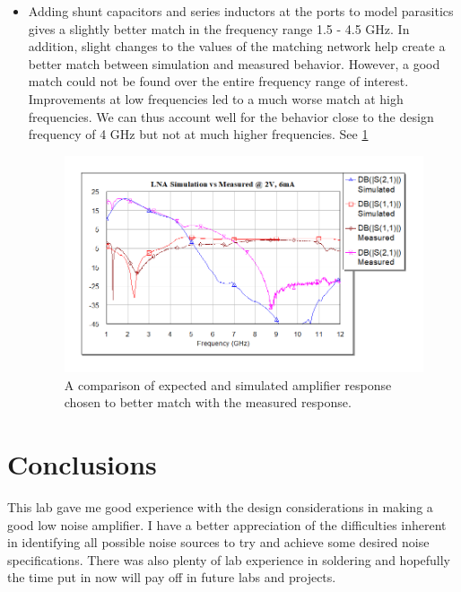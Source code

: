 \documentclass[twocolumn, aps, apl]{revtex4-1}
\begin{document}
\begin{itemize}
    \item Adding shunt capacitors and series inductors at the ports to model parasitics gives a slightly better match in the frequency range 1.5 - 4.5 GHz. In addition, slight changes to the values of the matching network help create a better match between simulation and measured behavior. However, a good match could not be found over the entire frequency range of interest. Improvements at low frequencies led to a much worse match at high frequencies. We can thus account well for the behavior close to the design frequency of 4 GHz but not at much higher frequencies. See \ref{fig:changedampsims}

    \begin{figure}[!htbp]
    \centering
    \includegraphics[scale=0.4]{LNA_simulated_measured.png}
    \caption{A comparison of expected and simulated amplifier response chosen to better match with the measured response.}
    \label{fig:changedampsims}
    \end{figure}

\end{itemize}

\section*{Conclusions}

This lab gave me good experience with the design considerations in making a good low noise amplifier. I have a better appreciation of the difficulties inherent in identifying all possible noise sources to try and achieve some desired noise specifications. There was also plenty of lab experience in soldering and hopefully the time put in now will pay off in future labs and projects. 
\end{document}
